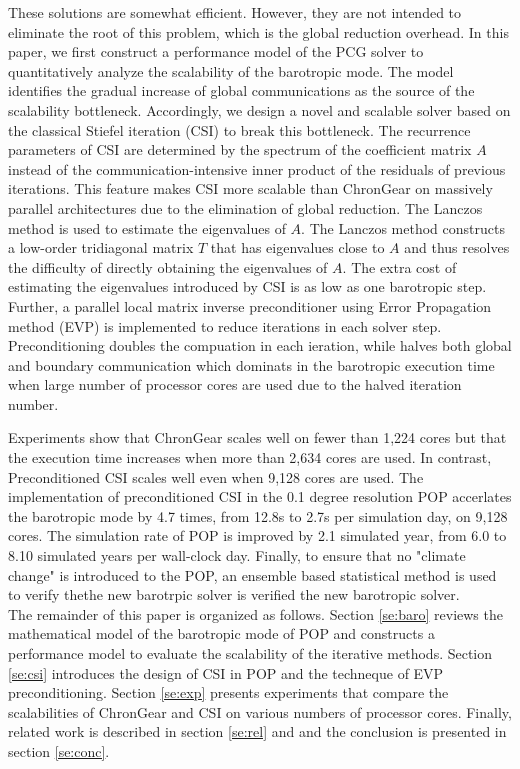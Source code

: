 \documentclass{sig-alternate}
\begin{document}
These solutions are somewhat efficient. 
However, they are not intended to eliminate the root of this problem, which is the global reduction overhead. 
In this paper, we first construct a performance model of the PCG solver to quantitatively analyze the scalability of the barotropic mode. 
The model identifies the gradual increase of global communications as the source of the scalability bottleneck. 
Accordingly, we design a novel and scalable solver based on the classical Stiefel iteration (CSI) to break this bottleneck. 
The recurrence parameters of CSI are determined by the spectrum of the coefficient matrix $A$ instead of the communication-intensive inner product of the residuals of previous iterations.
This feature makes CSI more scalable than ChronGear on massively parallel architectures due to the elimination of global reduction. 
The Lanczos method is used to estimate the eigenvalues of $A$. 
The Lanczos method constructs a low-order tridiagonal matrix $T$ that has eigenvalues close to $A$ and thus resolves the difficulty of directly obtaining the eigenvalues of $A$. 
The extra cost of estimating the eigenvalues introduced by CSI is as low as one barotropic step. 
Further, a parallel local matrix inverse preconditioner using Error Propagation method (EVP) \cite{roache1995elliptic} is implemented to reduce iterations in each solver step. 
Preconditioning doubles the compuation in each ieration, while halves both global  and boundary communication which dominats in the barotropic execution time when large number of processor cores are used due to the halved iteration number.

Experiments show that ChronGear scales well on fewer than 1,224 cores but that the execution time increases when more than 2,634 cores are used. 
In contrast, Preconditioned CSI scales well even when 9,128 cores are used.
The implementation of preconditioned CSI in the 0.1 degree resolution POP accerlates the barotropic mode by 4.7 times, from 12.8s to 2.7s per simulation day, on 9,128 cores. 
The simulation rate of POP is improved by 2.1 simulated year, from 6.0 to 8.10 simulated years per wall-clock day. 
Finally, to ensure that no "climate change" is introduced to the POP, an ensemble based statistical method is used to verify thethe new barotrpic solver is verified the new barotropic solver. \\

The remainder of this paper is organized as follows. 
Section \ref{se:baro} reviews the mathematical model of the barotropic mode of POP and constructs a performance model to evaluate the scalability of the iterative methods. 
Section \ref{se:csi} introduces the design of CSI in POP and the techneque of EVP preconditioning.
Section \ref{se:exp} presents experiments that compare the scalabilities of ChronGear and CSI on various numbers of processor cores. 
Finally, related work is described in section \ref{se:rel} and and the conclusion is presented in section \ref{se:conc}.
\end{document}
